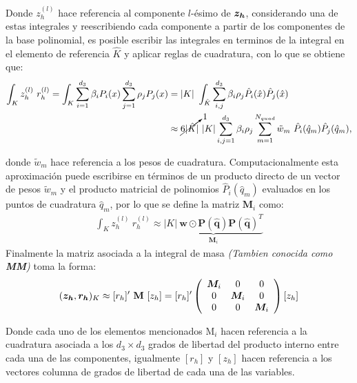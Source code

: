 \documentclass{article}
\begin{document}
\noindent Donde $z_h^{(l)}$ hace referencia al componente $l$-ésimo de $\boldsymbol{z_h}$, considerando una de estas integrales y reescribiendo cada componente a partir de los componentes de la base polinomial, es posible escribir las integrales en terminos de la integral en el elemento de referencia $\hat{K}$ y aplicar reglas de cuadratura, con lo que se obtiene que:
\begin{align*}
    \int_{K} z_h^{(l)}~r_h^{(l)} = \int_K \sum_{i = 1}^{d_3} \beta_i P_i(x) \sum_{j = 1}^{d_3} \rho_j P_j(x) &= |K|~\int_{\hat{K}} \sum_{i, j}^{d_3} \beta_i\rho_j \hat{P}_i(\hat{x})\hat{P}_j(\hat{x}) \\
    &\approx \cancelto{1}{6 |\hat{K}|}~|K| \sum_{i, j = 1}^{d_3} \beta_i\rho_j \sum_{m = 1}^{N_{quad}} \tilde{w}_m~\hat{P}_i(\hat{q}_m)\hat{P}_j(\hat{q}_m),
\end{align*}

\noindent donde $\tilde{w}_m$ hace referencia a los pesos de cuadratura. Computacionalmente esta aproximación puede escribirse en términos de un producto directo de un vector de pesos $\tilde{w}_m$ y el producto matricial de polinomios $\hat{P}_i(\hat{q}_m)$ evaluados en los puntos de cuadratura $\hat{q}_m$, por lo que se define la matriz $\boldsymbol{M}_i$ como:
\begin{align*}
    \int_{K} z_h^{(l)}~r_h^{(l)} \approx \underbrace{|K|~\boldsymbol{w} \odot \boldsymbol{P}(\boldsymbol{\hat{q}}) \boldsymbol{P}(\boldsymbol{\hat{q}})^T}_{\boldsymbol{M}_i}
\end{align*}
\noindent Finalmente la matriz asociada a la integral de masa \textit{(Tambien conocida como \textbf{MM})} toma la forma:
\begin{align}
    (\boldsymbol{z_h}, \boldsymbol{r_h})_K \approx
    [r_h]'~\mathbf{M}~[z_h] =
    [r_h]'
    \left(
    \begin{array}{ccc}
       \boldsymbol{M}_i  & 0 & 0 \\
        0 & \boldsymbol{M}_i & 0 \\
        0 & 0 & \boldsymbol{M}_i \\
    \end{array}
    \right)
    [z_h]
\end{align}

\noindent Donde cada uno de los elementos mencionados $\mathrm{M}_i$ hacen referencia a la cuadratura asociada a los $d_3 \times d_3$ grados de libertad del producto interno entre cada una de las componentes, igualmente $[r_h]$ y $[z_h]$ hacen referencia a los vectores columna de grados de libertad de cada una de las variables.
\end{document}
